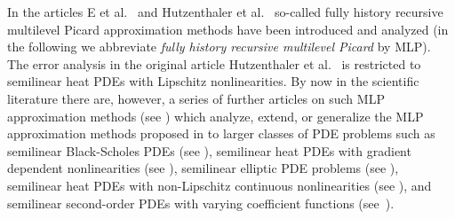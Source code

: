 \documentclass[12pt,AutoFakeBold,AutoFakeSlant]{article}
\theoremstyle{definition}
\begin{document}
	In the articles 
	E et al.~\cite{E2016multilevel}
	and 
	Hutzenthaler et al.~\cite{Hutzenthaleretal2018arXiv}
	so-called
	fully history recursive multilevel Picard approximation methods 
	have been introduced and analyzed (in the following we abbreviate 
	\emph{fully history recursive multilevel Picard} by MLP). 
	The error analysis in the original article 
	Hutzenthaler et al.~\cite{Hutzenthaleretal2018arXiv}
	is restricted to semilinear heat PDEs with Lipschitz nonlinearities. 
	By now in the scientific literature there are, however, a series of 
	further articles on such MLP approximation methods 
	(see \cite{hutzenthaler2019arxiv1903,Becketal2019MLP_nonlip_arXiv,giles2019generalised,beck2020arxiv2003,becker2020arxiv2005,hutzenthaler2019arxiv1912,hutzenthaler2020multilevel,
	E2019multilevel,hutzenthaler2020lipschitz}) 
	which analyze, extend, or generalize the 
	MLP approximation methods proposed in \cite{E2016multilevel,Hutzenthaleretal2018arXiv} 
	to larger classes of PDE problems such as 
	semilinear Black-Scholes PDEs (see \cite{hutzenthaler2019arxiv1903,becker2020arxiv2005}), 
	semilinear heat PDEs with gradient dependent nonlinearities (see \cite{hutzenthaler2019arxiv1912,hutzenthaler2020multilevel}), 
	semilinear elliptic PDE problems (see \cite{beck2020arxiv2003}), 
	semilinear heat PDEs with non-Lipschitz continuous nonlinearities (see \cite{Becketal2019MLP_nonlip_arXiv,becker2020arxiv2005}), 
	and 
	semilinear second-order PDEs with varying coefficient functions (see~\cite{hutzenthaler2019arxiv1903,hutzenthaler2020lipschitz}). 
\end{document}

